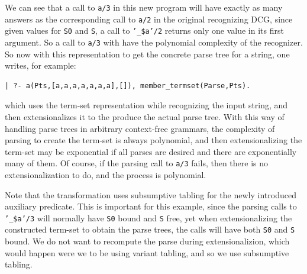 We can see that a call to {\tt a/3} in this new program will have
exactly as many answers as the corresponding call to {\tt a/2} in the
original recognizing DCG, since given values for {\tt S0} and {\tt S}, a
call to {\tt '\_\$a'/2} returns only one value in its first argument.
So a call to {\tt a/3} with have the polynomial complexity of the
recognizer.  So now with this representation to get the concrete parse
tree for a string, one writes, for example:
\begin{verbatim}
| ?- a(Pts,[a,a,a,a,a,a,a],[]), member_termset(Parse,Pts).
\end{verbatim}
which uses the term-set representation while recognizing the input
string, and then extensionalizes it to the produce the actual parse
tree.  With this way of handling parse trees in arbitrary context-free
grammars, the complexity of parsing to create the term-set is always
polynomial, and then extensionalizing the term-set may be exponential
if all parses are desired and there are exponentially many of them.
Of course, if the parsing call to {\tt a/3} fails, then there is no
extensionalization to do, and the process is polynomial.

Note that the transformation uses subsumptive tabling for the newly
introduced auxiliary predicate.  This is important for this example,
since the parsing calls to {\tt '\_\$a'/3} will normally have {\tt S0}
bound and {\tt S} free, yet when extensionalizing the constructed
term-set to obtain the parse trees, the calls will have both {\tt S0}
and {\tt S} bound.  We do not want to recompute the parse during
extensionalizion, which would happen were we to be using variant
tabling, and so we use subsumptive tabling.

